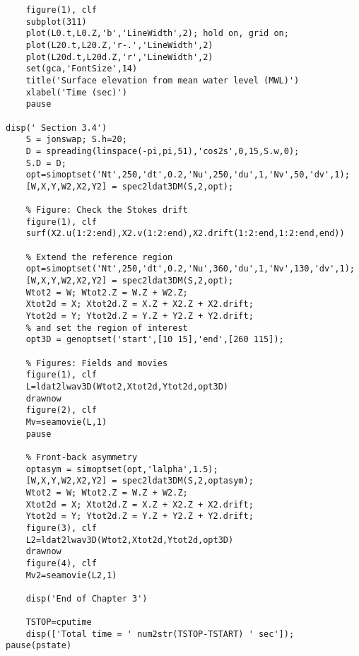 {\begin{verbatim}
    figure(1), clf
    subplot(311)
    plot(L0.t,L0.Z,'b','LineWidth',2); hold on, grid on;
    plot(L20.t,L20.Z,'r-.','LineWidth',2)
    plot(L20d.t,L20d.Z,'r','LineWidth',2)
    set(gca,'FontSize',14)
    title('Surface elevation from mean water level (MWL)')
    xlabel('Time (sec)')
    pause

disp(' Section 3.4')
    S = jonswap; S.h=20;
    D = spreading(linspace(-pi,pi,51),'cos2s',0,15,S.w,0);
    S.D = D;
    opt=simoptset('Nt',250,'dt',0.2,'Nu',250,'du',1,'Nv',50,'dv',1);
    [W,X,Y,W2,X2,Y2] = spec2ldat3DM(S,2,opt);
    
    % Figure: Check the Stokes drift
    figure(1), clf
    surf(X2.u(1:2:end),X2.v(1:2:end),X2.drift(1:2:end,1:2:end,end)) 
    
    % Extend the reference region
    opt=simoptset('Nt',250,'dt',0.2,'Nu',360,'du',1,'Nv',130,'dv',1);
    [W,X,Y,W2,X2,Y2] = spec2ldat3DM(S,2,opt);
    Wtot2 = W; Wtot2.Z = W.Z + W2.Z;
    Xtot2d = X; Xtot2d.Z = X.Z + X2.Z + X2.drift;
    Ytot2d = Y; Ytot2d.Z = Y.Z + Y2.Z + Y2.drift;
    % and set the region of interest
    opt3D = genoptset('start',[10 15],'end',[260 115]);
    
    % Figures: Fields and movies
    figure(1), clf
    L=ldat2lwav3D(Wtot2,Xtot2d,Ytot2d,opt3D)
    drawnow
    figure(2), clf
    Mv=seamovie(L,1)
    pause

    % Front-back asymmetry
    optasym = simoptset(opt,'lalpha',1.5);
    [W,X,Y,W2,X2,Y2] = spec2ldat3DM(S,2,optasym);
    Wtot2 = W; Wtot2.Z = W.Z + W2.Z;
    Xtot2d = X; Xtot2d.Z = X.Z + X2.Z + X2.drift;
    Ytot2d = Y; Ytot2d.Z = Y.Z + Y2.Z + Y2.drift;
    figure(3), clf
    L2=ldat2lwav3D(Wtot2,Xtot2d,Ytot2d,opt3D)
    drawnow
    figure(4), clf
    Mv2=seamovie(L2,1)

    disp('End of Chapter 3')
       
    TSTOP=cputime
    disp(['Total time = ' num2str(TSTOP-TSTART) ' sec']);
pause(pstate)   
\end{verbatim}
}
